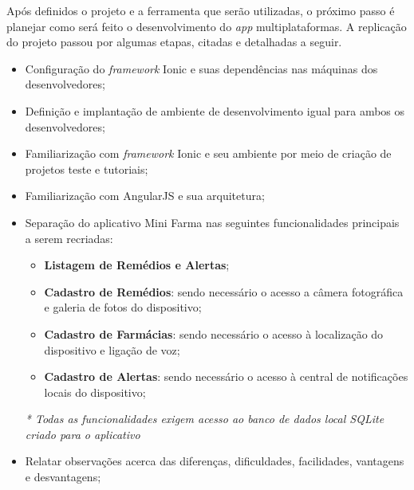Após definidos o projeto e a ferramenta que serão utilizadas, o próximo passo é planejar como será feito o desenvolvimento do \textit{app} multiplataformas. 
A replicação do projeto passou por algumas etapas, citadas e detalhadas a seguir.

\begin{itemize}
    \item Configuração do \textit{framework} Ionic e suas dependências nas máquinas dos desenvolvedores;
    \item Definição e implantação de ambiente de desenvolvimento igual para ambos os desenvolvedores;
    \item Familiarização com \textit{framework} Ionic e seu ambiente por meio de criação de projetos teste e tutoriais;
    \item Familiarização com AngularJS e sua arquitetura; 
    \item Separação do aplicativo Mini Farma nas seguintes funcionalidades principais a serem recriadas:
        \begin{itemize}
            \item \textbf{Listagem de Remédios e Alertas};
            \item \textbf{Cadastro de Remédios}: sendo necessário o acesso a câmera fotográfica e galeria de fotos do dispositivo;
            \item \textbf{Cadastro de Farmácias}: sendo necessário o acesso à localização do dispositivo e ligação de voz;
            \item \textbf{Cadastro de Alertas}: sendo necessário o acesso à central de notificações locais do dispositivo;
        \end{itemize}
        \textit{* Todas as funcionalidades exigem acesso ao banco de dados local SQLite criado para o aplicativo}
    \item Relatar observações acerca das diferenças, dificuldades, facilidades, vantagens e desvantagens;
\end{itemize}
